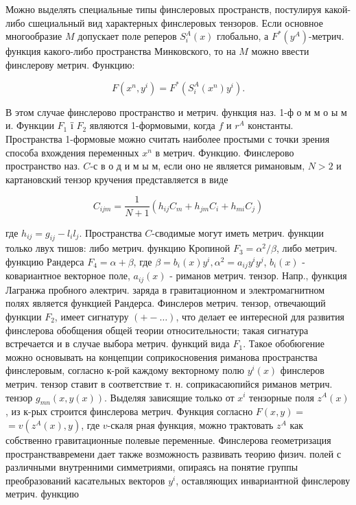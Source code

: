 \documentclass[10pt]{article}
\begin{document}
Можно выделять специальные типы финслеровых пространств, постулируя какой-либо сшециальный вид характерных финслеровых тензоров. Если основное многообразие $M$ допускает поле реперов $S_{i}^{A}(x)$ глобально, а $F^{*}\left(y^{A}\right)$-метрич. функция какого-либо пространства Минковского, то на $M$ можно ввести финслерову метрич. Функцию:



\[

F\left(x^{n}, y^{i}\right)=F^{*}\left(S_{i}^{A}\left(x^{n}\right) y^{i}\right) .

\]



В этом случае финслерово пространство и метрич. функция наз. 1-ф о м м о ы м и. Функции $F_{1}$ ї $F_{2}$ являются 1-формовыми, когда $f$ и $r^{A}$ константы. Пространства 1-формовые можно считать наиболее простыми с точки зрения способа вхождения переменных $x^{n}$ в метрич. Функцию. Финслерово пространство наз. $C$-с в о д и м ы м, если оно не является римановым, $N>2$ и картановский тензор кручения представляется в виде



\[

C_{i j m}=\frac{1}{N+1}\left(h_{i j} C_{m}+h_{j m} C_{i}+h_{m i} C_{j}\right)

\]



где $h_{i j}=g_{i j}-l_{i} l_{j}$. Пространства $C$-сводимые могут иметь метрич. функции только лвух тишов: либо метрич. функцию Кропиной $F_{3}=\alpha^{2} / \beta$, либо метрич. функцию Рандерса $F_{4}=\alpha+\beta$, где $\beta=b_{i}(x) y^{i}, \alpha^{2}=a_{i j} y^{i} y^{j}$, $b_{i}(x)$ - ковариантное векторное поле, $a_{i j}(x)$ - риманов метрич. тензор. Напр., функция Лагранжа пробного әлектрич. заряда в гравитационном и электромагнитном полях является функцией Рандерса. Финслеров метрич. тензор, отвечающий функции $F_{2}$, имеет сигнатуру $(+-\ldots)$, что делает ее интересной для развития финслерова обобщения общей теории относительности; такая сигнатура встречается и в случае выбора метрич. функций вида $F_{1}$. Такое обобюгение можно основывать на концепции соприкосновения риманова пространства финслеровым, согласно к-рой каждому векторному полю $y^{i}(x)$ финслеров метрич. тензор ставит в соответствие т. н. соприкасаюпийся риманов метрич. тензор $g_{m n}(x, y(x))$. Выделяя зависящие только от $x^{i}$ тензорные поля $z^{A}(x)$, из к-рых строится финслерова метрич. Функция согласно $F(x, y)=$ $=v\left(z^{A}(x), y\right)$, где $v$-скаля рная функция, можно трактовать $z^{A}$ как собственно гравитационные полевые переменные. Финслерова геометризация пространствавремени дает также возможность развивать теорию физич. полей с различными внутренними симметриями, опираясь на понятие группы преобразований касательных векторов $y^{i}$, оставляющих инвариантной финслерову метрич. функцию
\end{document}
